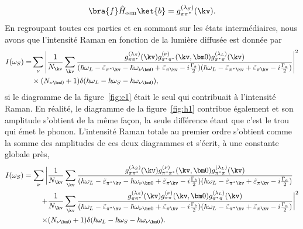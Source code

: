\begin{equation}
    \bra{f}\hat{H}_\text{eem}\ket{b} = g_{\pi\pi^*}^{(\lambda_S)}(\kv).
\end{equation}
En regroupant toutes ces parties et en sommant sur les états intermédiaires, nous avons que l'intensité Raman en fonction de la lumière diffusée est donnée par
\begin{equation}
    \begin{split}
    I(\omega_S) = &\sum_{\nu}\left|\frac{1}{N_\kv}\sum_{\kv}\frac{g_{\pi\pi^*}^{(\lambda_S)}(\kv)g_{\pi^*\pi^*}^{(\nu)}(\kv,\bm 0)g_{\pi^*\pi}^{(\lambda_L)}(\kv)}{(\hbar\omega_L-\tilde{\varepsilon}_{\pi^*\kv}-\hbar\omega_{\nu\bm 0}+\tilde{\varepsilon}_{\pi\kv}-i\frac{\Gamma_b}{2})(\hbar\omega_L-\tilde{\varepsilon}_{\pi^*\kv}+\tilde{\varepsilon}_{\pi\kv}-i\frac{\Gamma_a}{2})}\right|^2\\
    &\times(N_{\nu\bm 0}+1)\delta(\hbar\omega_L-\hbar\omega_S-\hbar\omega_{\nu\bm 0}),
    \end{split}
\end{equation}
si le diagramme de la figure~\ref{fig:e1} était le seul qui contribuait à l'intensité Raman. En réalité, le diagramme de la figure~\ref{fig:h1} contribue également et son amplitude s'obtient de la même façon, la seule différence étant que c'est le trou qui émet le phonon. L'intensité Raman totale au premier ordre s'obtient comme la somme des amplitudes de ces deux diagrammes et s'écrit, à une constante globale près,
\begin{equation}
    \begin{split}
        I(\omega_S) = \sum_\nu\bigg\rvert&\frac{1}{N_\kv}\sum_\kv\frac{g_{\pi\pi^*}^{(\lambda_S)}(\kv)g_{\pi^*\pi^*}^{(\nu)}(\kv,\bm 0)g_{\pi^*\pi}^{(\lambda_L)}(\kv)}{(\hbar\omega_L-\tilde{\varepsilon}_{\pi^*\kv}-\hbar\omega_{\nu\bm 0}+\tilde{\varepsilon}_{\pi\kv}-i\frac{\Gamma_b}{2})(\hbar\omega_L-\tilde{\varepsilon}_{\pi^*\kv}+\tilde{\varepsilon}_{\pi\kv}-i\frac{\Gamma_a}{2})}\\
        +&\frac{1}{N_\kv}\sum_\kv\frac{g_{\pi\pi^*}^{(\lambda_S)}(\kv)g_{\pi\pi}^{(\nu)}(\kv,\bm 0)g_{\pi^*\pi}^{(\lambda_L)}(\kv)}{(\hbar\omega_L-\tilde{\varepsilon}_{\pi^*\kv}-\hbar\omega_{\nu\bm 0}+\tilde{\varepsilon}_{\pi\kv}-i\frac{\Gamma_b}{2})(\hbar\omega_L-\tilde{\varepsilon}_{\pi^*\kv}+\tilde{\varepsilon}_{\pi\kv}-i\frac{\Gamma_a}{2})}\bigg\rvert^2\\
        \times&(N_{\nu\bm 0}+1)\delta(\hbar\omega_L-\hbar\omega_S-\hbar\omega_{\nu\bm 0}).\label{eqn:I_1phonon}
    \end{split}
\end{equation}
